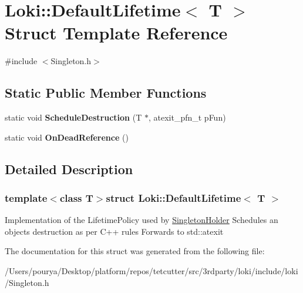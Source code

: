 \hypertarget{structLoki_1_1DefaultLifetime}{}\section{Loki\+:\+:Default\+Lifetime$<$ T $>$ Struct Template Reference}
\label{structLoki_1_1DefaultLifetime}


{\ttfamily \#include $<$Singleton.\+h$>$}

\subsection*{Static Public Member Functions}
\begin{DoxyCompactItemize}
\item 
\hypertarget{structLoki_1_1DefaultLifetime_ae368711b2fc33401c04cad59dbb78419}{}static void {\bfseries Schedule\+Destruction} (T $\ast$, atexit\+\_\+pfn\+\_\+t p\+Fun)\label{structLoki_1_1DefaultLifetime_ae368711b2fc33401c04cad59dbb78419}

\item 
\hypertarget{structLoki_1_1DefaultLifetime_ac259e7d796d544c1bc3721b00ad2c86c}{}static void {\bfseries On\+Dead\+Reference} ()\label{structLoki_1_1DefaultLifetime_ac259e7d796d544c1bc3721b00ad2c86c}

\end{DoxyCompactItemize}


\subsection{Detailed Description}
\subsubsection*{template$<$class T$>$struct Loki\+::\+Default\+Lifetime$<$ T $>$}

Implementation of the Lifetime\+Policy used by \hyperlink{classLoki_1_1SingletonHolder}{Singleton\+Holder} Schedules an object\textquotesingle{}s destruction as per C++ rules Forwards to std\+::atexit 

The documentation for this struct was generated from the following file\+:\begin{DoxyCompactItemize}
\item 
/\+Users/pourya/\+Desktop/platform/repos/tetcutter/src/3rdparty/loki/include/loki/Singleton.\+h\end{DoxyCompactItemize}

